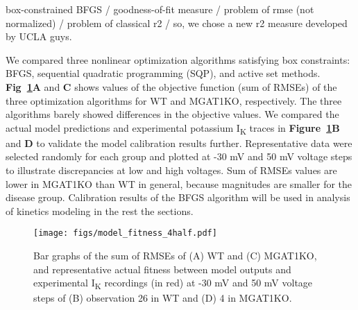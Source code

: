 \documentclass[11pt]{article}
\begin{document}
box-constrained BFGS / goodness-of-fit measure / problem of rmse (not normalized) / problem of classical r2 / so, we chose a new r2 measure developed by UCLA guys. 

We compared three nonlinear optimization algorithms satisfying box constraints: BFGS, sequential quadratic programming (SQP), and active set methods. \textbf{Fig~\ref{fig:model_fitness}A} and \textbf{C} shows values of the objective function (sum of RMSEs) of the three optimization algorithms for WT and MGAT1KO, respectively. The three algorithms barely showed differences in the objective values. We compared the actual model predictions and experimental potassium I\textsubscript{K} traces in \textbf{Figure~\ref{fig:model_fitness}B} and \textbf{D} to validate the model calibration results further. Representative data were selected randomly for each group and plotted at -30 mV and 50 mV voltage steps to illustrate discrepancies at low and high voltages. Sum of RMSEs values are lower in MGAT1KO than WT in general, because magnitudes are smaller for the disease group. Calibration results of the BFGS algorithm will be used in analysis of kinetics modeling in the rest the sections. 
\begin{figure}[!ht]
    \centering
    \texttt{[image: figs/model\_fitness\_4half.pdf]}
    \caption{Bar graphs of the sum of RMSEs of (A) WT and (C) MGAT1KO, and representative actual fitness between model outputs and experimental I\textsubscript{K} recordings (in red) at -30 mV and 50 mV voltage steps of (B) observation 26 in WT and (D) 4 in MGAT1KO.}
    \label{fig:model_fitness}
\end{figure}
\end{document}
